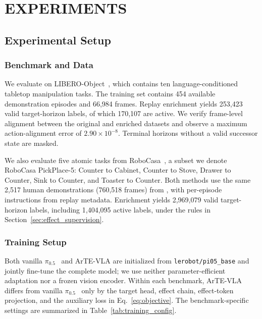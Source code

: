 \documentclass[letterpaper,10pt,conference]{ieeeconf}
\newcommand{\method}{ArTE-VLA}
\newcommand{\pihalf}{\ensuremath{\pi_{0.5}}}
\begin{document}
\section{EXPERIMENTS}
\label{sec:experiments}

\subsection{Experimental Setup}

\subsubsection{Benchmark and Data}

We evaluate on LIBERO-Object~\cite{libero}, which contains ten language-conditioned tabletop manipulation tasks.
The training set contains 454 available demonstration episodes and 66,984 frames.
Replay enrichment yields 253,423 valid target-horizon labels, of which 170,107 are active.
We verify frame-level alignment between the original and enriched datasets and observe a maximum action-alignment error of $2.90\times10^{-8}$.
Terminal horizons without a valid successor state are masked.

We also evaluate five atomic tasks from RoboCasa~\cite{robocasa2024}, a subset we denote RoboCasa PickPlace-5: Counter to Cabinet, Counter to Stove, Drawer to Counter, Sink to Counter, and Toaster to Counter.
Both methods use the same 2,517 human demonstrations (760,518 frames) from , with per-episode instructions from replay metadata.
Enrichment yields 2,969,079 valid target-horizon labels, including 1,404,095 active labels, under the rules in Section~\ref{sec:effect_supervision}.

\subsubsection{Training Setup}

Both vanilla \pihalf{}~\cite{pi05} and \method{} are initialized from \texttt{lerobot/pi05\_base} and jointly fine-tune the complete model; we use neither parameter-efficient adaptation nor a frozen vision encoder.
Within each benchmark, \method{} differs from vanilla \pihalf{}~\cite{pi05} only by the target head, effect chain, effect-token projection, and the auxiliary loss in Eq.~\eqref{eq:objective}.
The benchmark-specific settings are summarized in Table~\ref{tab:training_config}.
\end{document}
